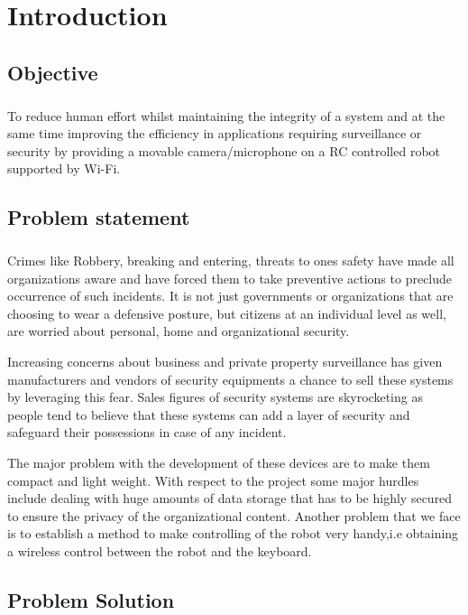 \chapter{Introduction}
\section{Objective}
\paragraph{}To reduce human effort whilst maintaining the integrity of a system and at the same time improving the efficiency in applications requiring surveillance or security by providing a movable camera/microphone on a RC controlled robot supported by Wi-Fi.
\section{Problem statement}
\paragraph{}Crimes like Robbery, breaking and entering, threats to ones safety have made all organizations aware and have forced them to take preventive actions to preclude occurrence of such incidents. It is not just governments or organizations that are choosing to wear a defensive posture, but citizens at an individual level as well, are worried about personal, home and organizational security.
\newline

Increasing concerns about business and private property surveillance has given manufacturers and vendors of security equipments a chance to sell these systems by leveraging this fear. Sales figures of security systems are skyrocketing as people tend to believe that these systems can add a layer of security and safeguard their possessions in case of any incident.
\newline

The major problem with the development of these devices are to make them compact and light weight. With respect to the project some major hurdles include dealing with huge amounts of data storage that has to be highly secured to ensure the privacy of the organizational content. Another problem that we face is to establish a method to make controlling of the robot very handy,i.e obtaining a wireless control between the robot and the keyboard.
\section{Problem Solution}
